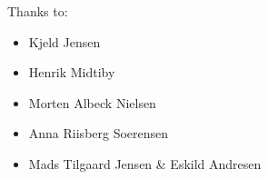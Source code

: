 Thanks to: 
\begin{itemize}
	\item Kjeld Jensen
	\item Henrik Midtiby 
	\item Morten Albeck Nielsen
	\item Anna Riisberg Soerensen
	\item Mads Tilgaard Jensen \& Eskild Andresen 
\end{itemize}
